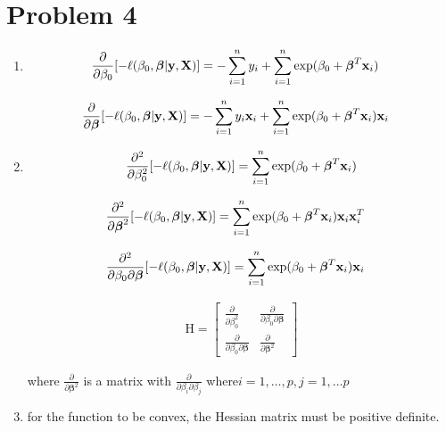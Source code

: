\documentclass{article}
\newcommand{\vect}[1]{\boldsymbol{#1}}
\newcommand{\vectrm}[1]{\boldsymbol{\rm #1}}
\begin{document}
\section*{Problem 4}
\begin{enumerate}[label=(\alph*)]
\item 
\begin{align*}
\frac{\partial}{\partial \beta_0}[ -\ell(\beta_0, \vect{\beta}| \vectrm{y}, \vectrm{X}) ]&= -\sum_{i=1}^{n} y_i + \sum_{i=1}^{n}\exp(\beta_0 + \vect{\beta}^T \vectrm{x}_i) 
\end{align*}

\begin{align*}
\frac{\partial}{\partial \vect{\beta}}[ -\ell(\beta_0, \vect{\beta}| \vectrm{y}, \vectrm{X}) ]&= -\sum_{i=1}^{n} y_i \vectrm{x}_i + \sum_{i=1}^{n}\exp(\beta_0 + \vect{\beta}^T \vectrm{x}_i) \vectrm{x}_i
\end{align*}

\item
\begin{align*}
\frac{\partial^2}{\partial \beta_0^2}[ -\ell(\beta_0, \vect{\beta}| \vectrm{y}, \vectrm{X}) ]&= \sum_{i=1}^{n}\exp(\beta_0 + \vect{\beta}^T \vectrm{x}_i) \\
\end{align*}

\begin{align*}
\frac{\partial^2}{\partial \vect{\beta}^2}[ -\ell(\beta_0, \vect{\beta}| \vectrm{y}, \vectrm{X}) ]&= \sum_{i=1}^{n}\exp(\beta_0 + \vect{\beta}^T \vectrm{x}_i) \vectrm{x}_i \vectrm{x}_i^T
\end{align*}

\begin{align*}
\frac{\partial^2}{\partial \beta_0 \partial \vect{\beta}}[ -\ell(\beta_0, \vect{\beta}| \vectrm{y}, \vectrm{X}) ]&= \sum_{i=1}^{n}\exp(\beta_0 + \vect{\beta}^T \vectrm{x}_i) \vectrm{x}_i
\end{align*}

\begin{align*}
\mathrm{H} = \begin{bmatrix}
    \frac{\partial}{\partial \beta_0^2} & \frac{\partial}{\partial \beta_0 \partial \vect{\beta}} \\
    \frac{\partial}{\partial \beta_0 \partial \vect{\beta}} & \frac{\partial}{\partial \vect{\beta}^2}
\end{bmatrix}
\end{align*}

where \(\frac{\partial}{\partial \vect{\beta}^2}\) is a matrix with \(\frac{\partial}{\partial \beta_i \partial \beta_j}\) where\(i = 1,\ldots, p, j = 1,\ldots p\)

\item for the function to be convex, the Hessian matrix must be positive definite.
\end{enumerate}
\end{document}

